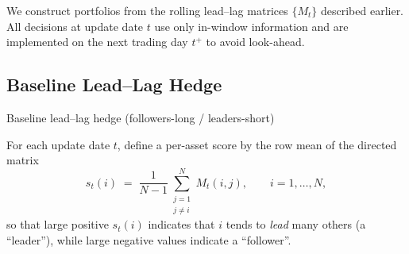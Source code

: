 We construct portfolios from the rolling lead--lag matrices $\{M_t\}$ described earlier.
All decisions at update date $t$ use only in-window information and are implemented on the next trading day $t^+$ to avoid look-ahead.

\subsection{Baseline Lead--Lag Hedge}\label{sec:baseline}

\begin{algorithm}[H]
\caption{Baseline lead--lag hedge (followers-long / leaders-short)}
\label{alg:baseline2e}

\end{algorithm}


For each update date $t$, define a per-asset score by the row mean of the directed matrix
\[
s_t(i)\;=\;\frac{1}{N-1}\sum_{\substack{j=1\\ j\neq i}}^{N} M_t(i,j),\qquad i=1,\dots,N,
\]
so that large positive $s_t(i)$ indicates that $i$ tends to \emph{lead} many others (a ``leader''), while large negative values indicate a ``follower''.


